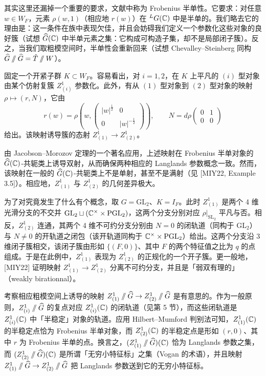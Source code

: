 其实这里还漏掉一个重要的要求，文献中称为 Frobenius 半单性。它要求：对任意 $w\in W_F$，元素 $\rho(w,1)$（相应地 $r(w)$）在 ${}^LG(\mathbb{C})$ 中是半单的。我们略去它的理由是：这一条件在族中表现欠佳，并且会妨碍我们定义一个参数化这些对象的良好簇（试想 $\widehat{G}(\mathbb{C})$ 中半单元素之集：它构成可构造子集，却不是局部闭子簇）。反之，当我们取粗模空间时，半单性会重新回来（试想 Chevalley–Steinberg 同构 $\widehat{G}\sslash\widehat{G}=\hat T\sslash W$）。

固定一个开紧子群 $K\subset W_F$。容易看出，对 $i=1,2$，在 $K$ 上平凡的 $(i)$ 型对象由某个仿射复簇 $Z^1_{(i)}$ 参数化。此外，有从 $(1)$ 型对象到 $(2)$ 型对象的映射 $\rho\mapsto(r,N)$，它由
\[
r(w)=\rho\left(w,\begin{pmatrix}|w|^{\frac12}&0\\0&|w|^{-\frac12}\end{pmatrix}\right),\qquad
N=d\rho\begin{pmatrix}0&1\\0&0\end{pmatrix}
\]
给出。该映射诱导簇的态射 $Z^1_{(1)}\to Z^1_{(2)}$。

由 Jacobson–Morozov 定理的一个著名应用，上述映射在 Frobenius 半单对象的 $\widehat{G}(\mathbb{C})$-共轭类上诱导双射，从而确保两种相应的 Langlands 参数概念一致。然而，该映射在一般的 $\widehat{G}(\mathbb{C})$-共轭类上不是单射，甚至不是满射（见 [MIY22, Example 3.5]）。相应地，$Z^1_{(1)}$ 与 $Z^1_{(2)}$ 的几何差异极大。

为了对究竟发生了什么有个概念，取 $G=\mathrm{GL}_2$、$K=I_F$。此时 $Z^1_{(1)}$ 是两个 4 维光滑分支的不交并 $\mathrm{GL}_2\sqcup(\mathbb{C}^\times\times\mathrm{PGL}_2)$，这两个分支分别对应 $\rho|_{\mathrm{SL}_2}$ 平凡与否。相反，$Z^1_{(2)}$ 连通，其两个 4 维不可约分支分别由 $N=0$ 的闭轨道（同构于 $\mathrm{GL}_2$）与 $N\ne0$ 的开轨道之闭包（该开轨道同构于 $\mathbb{C}^\times\times\mathrm{PGL}_2$）给出。这两个分支沿 3 维闭子簇相交，该闭子簇由形如 $\{(F,0)\}$、其中 $F$ 的两个特征值之比为 $q$ 的点组成。于是在此例中，$Z^1_{(1)}$ 表现为 $Z^1_{(2)}$ 的正规化的一个开子簇。更一般地，[MIY22] 证明映射 $Z^1_{(1)}\to Z^1_{(2)}$ 分离不可约分支，并且是「弱双有理的」（weakly birationnal）。

考察相应粗模空间上诱导的映射 $Z^1_{(1)}\sslash\widehat{G}\to Z^1_{(2)}\sslash\widehat{G}$ 是有意思的。作为一般原则，$Z^1_{(i)}\sslash\widehat{G}$ 的复点对应 $Z^1_{(i)}(\mathbb{C})$ 的闭轨道（见第 5 节），而这些闭轨道是 $Z^1_{(i)}(\mathbb{C})$ 中「半稳定」对象的轨道。应用 Hilbert–Mumford 判别法可知，$Z^1_{(1)}(\mathbb{C})$ 的半稳定点恰为 Frobenius 半单对象，而 $Z^1_{(2)}(\mathbb{C})$ 的半稳定点是形如 $(r,0)$、其中 $r$ 为 Frobenius 半单的点。换言之，$(Z^1_{(1)}\sslash\widehat{G})(\mathbb{C})$ 恰为 Langlands 参数之集，而 $(Z^1_{(2)}\sslash\widehat{G})(\mathbb{C})$ 是所谓「无穷小特征标」之集（Vogan 的术语），并且映射 $Z^1_{(1)}\sslash\widehat{G}\to Z^1_{(2)}\sslash\widehat{G}$ 把 Langlands 参数送到它的无穷小特征标。

